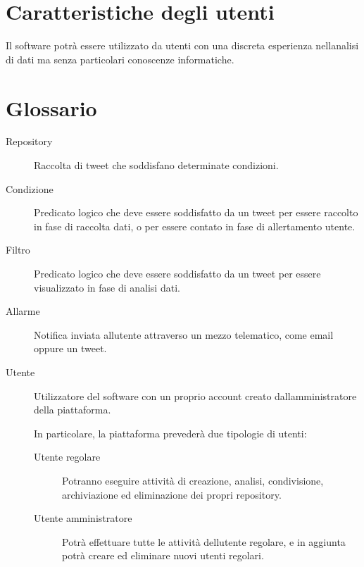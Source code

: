 \documentclass[letterpaper,10pt,italian]{sphinxmanual}
\begin{document}
\section{Caratteristiche degli utenti}
\label{\detokenize{development/goals:caratteristiche-degli-utenti}}
\sphinxAtStartPar
Il software potrà essere utilizzato da utenti con una discreta esperienza nell\textquotesingle{}analisi di dati ma senza particolari
conoscenze informatiche.


\section{Glossario}
\label{\detokenize{development/goals:glossario}}\begin{description}
\item[{Repository}] \leavevmode
\sphinxAtStartPar
Raccolta di tweet che soddisfano determinate condizioni.

\item[{Condizione}] \leavevmode
\sphinxAtStartPar
Predicato logico che deve essere soddisfatto da un tweet per essere raccolto in fase di raccolta dati, o per essere
contato in fase di allertamento utente.

\item[{Filtro}] \leavevmode
\sphinxAtStartPar
Predicato logico che deve essere soddisfatto da un tweet per essere visualizzato in fase di analisi dati.

\item[{Allarme}] \leavevmode
\sphinxAtStartPar
Notifica inviata all\textquotesingle{}utente attraverso un mezzo telematico, come email oppure un tweet.

\item[{Utente}] \leavevmode
\sphinxAtStartPar
Utilizzatore del software con un proprio account creato dall\textquotesingle{}amministratore della piattaforma.

\sphinxAtStartPar
In particolare, la piattaforma prevederà due tipologie di utenti:
\begin{description}
\item[{Utente regolare}] \leavevmode
\sphinxAtStartPar
Potranno eseguire attività di creazione, analisi, condivisione, archiviazione ed eliminazione dei propri repository.

\item[{Utente amministratore}] \leavevmode
\sphinxAtStartPar
Potrà effettuare tutte le attività dell\textquotesingle{}utente regolare, e in aggiunta potrà creare ed eliminare nuovi utenti
regolari.

\end{description}

\end{description}
\end{document}
